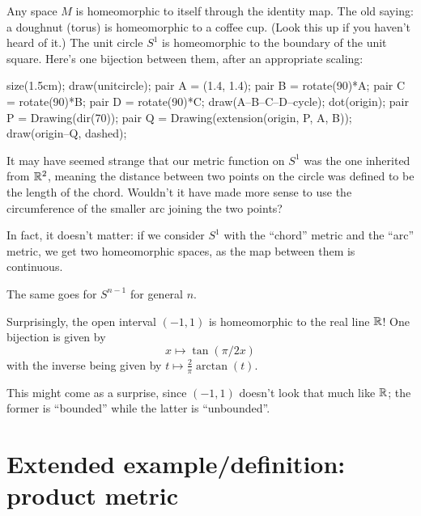 \begin{example}
	\listhack
	\begin{enumerate}[(a)]
		\ii Any space $M$ is homeomorphic to itself
		through the identity map.
		\ii The old saying: a doughnut (torus) is
		homeomorphic to a coffee cup.
		(Look this up if you haven't heard of it.)
		\ii The unit circle $S^1$ is homeomorphic
		to the boundary of the unit square.
		Here's one bijection between them, after an appropriate scaling:
		\begin{center}
			\begin{asy}
				size(1.5cm);
				draw(unitcircle);
				pair A = (1.4, 1.4);
				pair B = rotate(90)*A;
				pair C = rotate(90)*B;
				pair D = rotate(90)*C;
				draw(A--B--C--D--cycle);
				dot(origin);
				pair P = Drawing(dir(70));
				pair Q = Drawing(extension(origin, P, A, B));
				draw(origin--Q, dashed);
			\end{asy}
		\end{center}
	\end{enumerate}
\end{example}
\begin{example}
	It may have seemed strange that our metric function on $S^1$
	was the one inherited from $\mathbb R^2$,
	meaning the distance between two points
	on the circle was defined to be the length of the chord.
	Wouldn't it have made more sense to use the circumference of the
	smaller arc joining the two points?

	In fact, it doesn't matter:
	if we consider $S^1$ with the ``chord'' metric
	and the ``arc'' metric, we get two homeomorphic spaces,
	as the map between them is continuous.

	The same goes for $S^{n-1}$ for general $n$.
\end{example}

\begin{example}
	Surprisingly, the open interval $(-1,1)$
	is homeomorphic to the real line $\mathbb R$!
	One bijection is given by
	\[ x \mapsto \tan(\pi/2 x) \]
	with the inverse being given by $t \mapsto \frac2\pi \arctan(t)$.

	This might come as a surprise,
	since $(-1,1)$ doesn't look that much like $\mathbb R$;
	the former is ``bounded'' while the latter is ``unbounded''.
\end{example}

\section{Extended example/definition: product metric}

